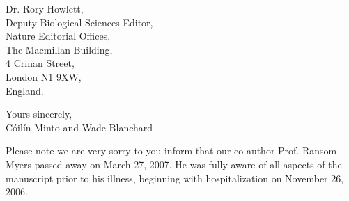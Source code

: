 \documentclass[a4paper,12pt]{letter}
\begin{document}
\begin{letter}{Dr. Rory Howlett,\\Deputy Biological Sciences Editor,\\
Nature Editorial Offices,\\The Macmillan Building,\\ 4 Crinan Street, \\ London N1 9XW,  \\ England.}
\closing{Yours sincerely,\\ \vspace{.07in} C\'oil\'in Minto and Wade Blanchard} %
\vspace{-.5in}
Please note we are very sorry to you inform that our co-author Prof. Ransom Myers passed away on March 27, 2007. He was fully aware of all aspects of the manuscript prior to his illness, beginning with hospitalization on November 26, 2006.\\

\end{letter}
\end{document}
